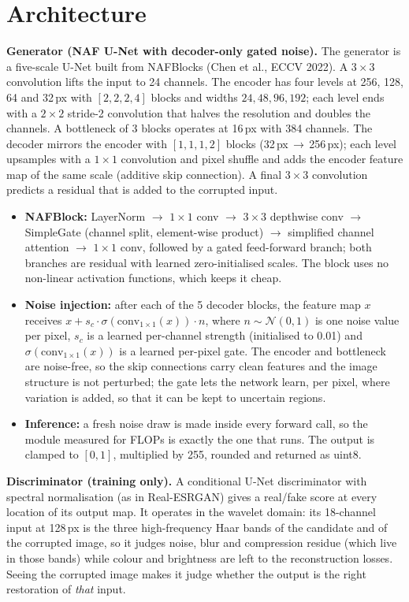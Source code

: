 \documentclass[10pt,a4paper]{article}
\begin{document}
\section{Architecture}
\textbf{Generator (NAF U-Net with decoder-only gated noise).} The generator is a five-scale U-Net
built from NAFBlocks (Chen et al., ECCV 2022). A $3\times3$ convolution lifts the input to 24
channels. The encoder has four levels at 256, 128, 64 and 32\,px with
$[2,2,2,4]$ blocks and widths $24,48,96,192$; each level ends with a $2\times2$ stride-2
convolution that halves the resolution and doubles the channels. A bottleneck of 3 blocks
operates at 16\,px with 384 channels. The decoder mirrors the encoder with $[1,1,1,2]$ blocks
(32\,px\,$\rightarrow$\,256\,px); each level upsamples with a $1\times1$ convolution and pixel
shuffle and adds the encoder feature map of the same scale (additive skip connection). A final
$3\times3$ convolution predicts a residual that is added to the corrupted input.
\begin{itemize}
  \item \textbf{NAFBlock:} LayerNorm $\rightarrow$ $1\times1$ conv $\rightarrow$ $3\times3$
        depthwise conv $\rightarrow$ SimpleGate (channel split, element-wise product)
        $\rightarrow$ simplified channel attention $\rightarrow$ $1\times1$ conv, followed by a
        gated feed-forward branch; both branches are residual with learned zero-initialised
        scales. The block uses no non-linear activation functions, which keeps it cheap.
  \item \textbf{Noise injection:} after each of the 5 decoder blocks, the feature map $x$
        receives $x + s_c\cdot\sigma(\mathrm{conv}_{1\times1}(x))\cdot n$, where
        $n\sim\mathcal{N}(0,1)$ is one noise value per pixel, $s_c$ is a learned per-channel
        strength (initialised to 0.01) and $\sigma(\mathrm{conv}_{1\times1}(x))$ is a learned
        per-pixel gate. The encoder and bottleneck are noise-free, so the skip connections carry
        clean features and the image structure is not perturbed; the gate lets the network learn,
        per pixel, where variation is added, so that it can be kept to uncertain regions.
  \item \textbf{Inference:} a fresh noise draw is made inside every forward call, so the module
        measured for FLOPs is exactly the one that runs. The output is clamped to $[0,1]$, multiplied by 255, rounded and returned as uint8.
\end{itemize}
\textbf{Discriminator (training only).} A conditional U-Net discriminator with spectral
normalisation (as in Real-ESRGAN) gives a real/fake score at every location of its output map. It operates in the
wavelet domain: its 18-channel input at 128\,px is the three high-frequency Haar bands of the
candidate and of the corrupted image, so it judges noise, blur and compression residue (which live
in those bands) while colour and brightness are left to the reconstruction losses. Seeing the
corrupted image makes it judge whether the output is the right restoration of \emph{that} input.
\end{document}
